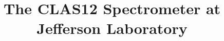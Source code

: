 \documentclass[final,3p,twocolumn]{elsarticle}
\begin{document}
\begin{frontmatter}

\title{The CLAS12 Spectrometer at Jefferson Laboratory}


\end{frontmatter}
\end{document}
